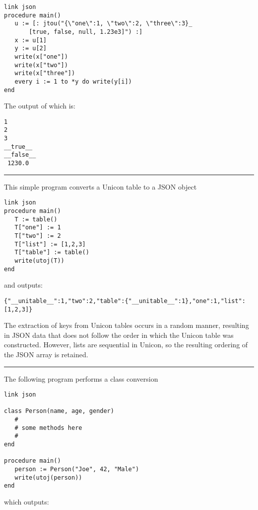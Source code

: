 \documentclass[letterpaper,12pt]{article}
\begin{document}
\begin{verbatim}
link json
procedure main()
   u := [: jtou("{\"one\":1, \"two\":2, \"three\":3}_
       [true, false, null, 1.23e3]") :]
   x := u[1]
   y := u[2]
   write(x["one"])
   write(x["two"])
   write(x["three"])
   every i := 1 to *y do write(y[i])
end
\end{verbatim}

\vspace{0.1cm}
\noindent
The output of which is:

\begin{verbatim}
1
2
3
__true__
__false__
 1230.0
\end{verbatim}

\bigskip
\hrule\vspace{0.1cm}
\bigskip
\noindent
This simple program converts a Unicon table to a JSON object

\begin{verbatim}
link json
procedure main()
   T := table()
   T["one"] := 1
   T["two"] := 2
   T["list"] := [1,2,3]
   T["table"] := table()
   write(utoj(T))
end
\end{verbatim}

\vspace{0.1cm}
\noindent
and outputs:

\begin{verbatim}
{"__unitable__":1,"two":2,"table":{"__unitable__":1},"one":1,"list":[1,2,3]}
\end{verbatim}

The extraction of keys from Unicon tables occurs in a random manner,
resulting in JSON data that does not follow the order in which the Unicon
table was constructed. However, lists are sequential in Unicon, so the
resulting ordering of the JSON array is retained. 

\bigskip
\hrule\vspace{0.1cm}
\bigskip
\noindent
The following program performs a class conversion 

\begin{verbatim}
link json

class Person(name, age, gender)
   #
   # some methods here
   #
end

procedure main()
   person := Person("Joe", 42, "Male")
   write(utoj(person))
end
\end{verbatim}

\vspace{0.1cm}
\noindent
which outputs:
\end{document}
